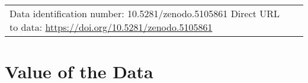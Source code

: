 \documentclass[times,final]{elsarticle}
\begin{document}
{\begin{longtable}{|p{33mm}|p{94mm}|}
                         Data identification number: 10.5281/zenodo.5105861 \newline
                         Direct URL to data: \url{https://doi.org/10.5281/zenodo.5105861} \newline
\\                         






\end{longtable}
}

\section*{Value of the Data}
\end{document}
